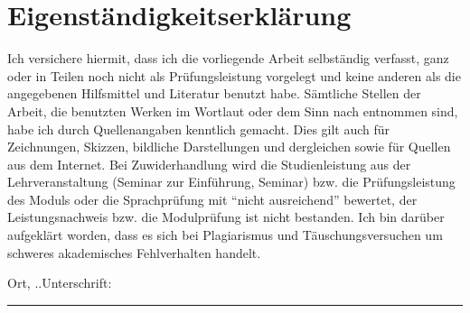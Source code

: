 \section*{Eigenständigkeitserklärung}
Ich versichere hiermit, dass ich die vorliegende Arbeit selbständig verfasst, ganz oder in Teilen noch nicht als Prüfungsleistung vorgelegt und keine anderen als die angegebenen Hilfsmittel und Literatur benutzt habe. Sämtliche Stellen der Arbeit, die benutzten Werken im Wortlaut oder dem Sinn nach entnommen sind, habe ich durch Quellenangaben kenntlich gemacht. Dies gilt auch für Zeichnungen, Skizzen, bildliche Darstellungen und dergleichen sowie für Quellen aus dem Internet. Bei Zuwiderhandlung wird die Studienleistung aus der Lehrveranstaltung (Seminar zur Einführung, Seminar) bzw. die Prüfungsleistung des Moduls oder die Sprachprüfung mit \enquote{nicht ausreichend} bewertet, der Leistungsnachweis bzw. die Modulprüfung ist nicht bestanden. Ich bin darüber aufgeklärt worden, dass es sich bei Plagiarismus und Täuschungsversuchen um schweres akademisches Fehlverhalten handelt.


\vspace{1.2cm}
\noindent{}Ort, \the\day.\the\month.\the\year\hfill{}Unterschrift: \rule{4.3cm}{.4pt}\par